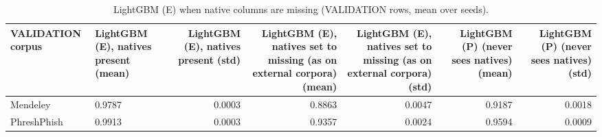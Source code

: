 \begin{table}[t]
\centering
\scriptsize
\caption{LightGBM (E) when native columns are missing (VALIDATION rows, mean over seeds).}
\label{tab:rev_R2_lightgbmE_missing_native_test}
\begin{tabular}{llrrrrr}
\toprule
VALIDATION corpus & LightGBM (E), natives present (mean) & LightGBM (E), natives present (std) & LightGBM (E), natives set to missing (as on external corpora) (mean) & LightGBM (E), natives set to missing (as on external corpora) (std) & LightGBM (P) (never sees natives) (mean) & LightGBM (P) (never sees natives) (std) \\
\midrule
Mendeley & 0.9787 & 0.0003 & 0.8863 & 0.0047 & 0.9187 & 0.0018 \\
PhreshPhish & 0.9913 & 0.0003 & 0.9357 & 0.0024 & 0.9594 & 0.0009 \\
\bottomrule
\end{tabular}
\end{table}